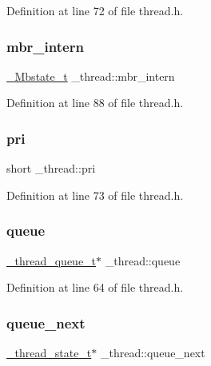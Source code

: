 Definition at line 72 of file thread.\+h.

\mbox{\label{struct__thread_a7a9e7af384abbfb902e54ce4f16e4654}} 
\subsubsection{\texorpdfstring{mbr\_intern}{mbr\_intern}}
{\footnotesize\ttfamily \mbox{\hyperlink{wchar__t_8h_a1e09beddcdd9f7bff253836c6de67964}{\+\_\+\+Mbstate\+\_\+t}} \+\_\+thread\+::mbr\+\_\+intern}



Definition at line 88 of file thread.\+h.

\mbox{\label{struct__thread_a74c458464917ed3d1f548fccd9c906d7}} 
\subsubsection{\texorpdfstring{pri}{pri}}
{\footnotesize\ttfamily short \+\_\+thread\+::pri}



Definition at line 73 of file thread.\+h.

\mbox{\label{struct__thread_a26c9ef87b799f4ed1e0f9a3824385537}} 
\subsubsection{\texorpdfstring{queue}{queue}}
{\footnotesize\ttfamily \mbox{\hyperlink{thread_8h_acb75659012caf2e738ff936db5473447}{\+\_\+thread\+\_\+queue\+\_\+t}}$\ast$ \+\_\+thread\+::queue}



Definition at line 64 of file thread.\+h.

\mbox{\label{struct__thread_aaa10b9f1f435fc73735ad02eb5e617c6}} 
\subsubsection{\texorpdfstring{queue\_next}{queue\_next}}
{\footnotesize\ttfamily \mbox{\hyperlink{thread_8h_ab20cd1a493b8dba6200fdc5912bec0d0}{\+\_\+thread\+\_\+state\+\_\+t}}$\ast$ \+\_\+thread\+::queue\+\_\+next}




